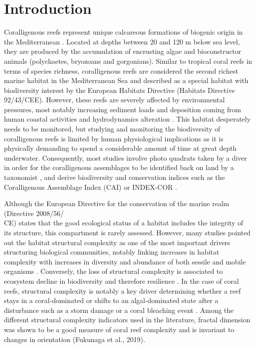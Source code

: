 \section{Introduction}\label{chapitre4_1}
Coralligenous reefs represent unique calcareous formations of biogenic origin in the Mediterranean \citep{ballesteros_mediterranean_2006}. Located at depths between 20 and 120 m below sea level, they are produced by the accumulation of encrusting algae and bioconstructor animals (polychaetes, bryozoans and gorgonians). Similar to tropical coral reefs in terms of species richness, coralligenous reefs are considered the second richest marine habitat in the Mediterranean Sea \citep{boudouresque_marine_2004} and described as a special habitat with biodiversity interest by the European Habitats Directive (Habitats Directive 92/43/CEE). However, these reefs are severely affected by environmental pressures, most notably increasing sediment loads and deposition coming from human coastal activities and hydrodynamics alteration \citep{airoldi_effects_2003, ballesteros_mediterranean_2006}. This habitat desperately needs to be monitored, but studying and monitoring the biodiversity of coralligenous reefs is limited by human physiological implications as it is physically demanding to spend a considerable amount of time at great depth underwater. Consequently, most  studies involve photo quadrats taken by a diver in order for the coralligenous assemblages to be identified back on land by a taxonomist \citep{deter_rapid_2012, kipson_rapid_2011, sartoretto_integrated_2017}, and derive biodiversity and conservation indices such as the Coralligenous Assemblage Index (CAI) \citep{deter_preliminary_2012} or INDEX-COR \citep{sartoretto_integrated_2017}.

Although the European Directive for the conservation of the marine realm (Directive 2008/56/\\CE) states that the good ecological status of a habitat includes the integrity of its structure, this compartment is rarely assessed. However, many studies pointed out the habitat structural complexity as one of the most important drivers structuring biological communities, notably linking increases in habitat complexity with increases in diversity and abundance of both sessile and mobile organisms \citep{darling_relationships_2017, graham_importance_2013, gratwicke_relationship_2005, harborne_biotic_2011, kovalenko_habitat_2012, luckhurst_analysis_1978, meager_topographic_2011, rees_abiotic_2014}. Conversely, the loss of structural complexity is associated to ecosystem decline in biodiversity and therefore resilience \citep{ferrari_quantifying_2016}. In the case of coral reefs, structural complexity is notably a key driver determining whether a reef stays in a coral-dominated or shifts to an algal-dominated state after a disturbance such as a storm damage or a coral bleaching event \citep{graham_predicting_2015}. Among the different structural complexity indicators used in the literature, fractal dimension was shown to be a good measure of coral reef complexity and is invariant to changes in orientation (Fukunaga et al., 2019).

